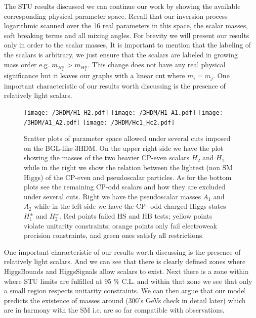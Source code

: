 The STU results discussed we can continue our work by showing the available corresponding physical parameter space. 
%
Recall that our inversion process logarithmic scanned over the 16 real parameters in this space, the scalar masses, soft breaking terms and all mixing angles.  
%
For brevity we will present our results only in order to the scalar masses,
%
%
It is important to mention that the labeling of the scalars is arbitrary, we just ensure that the scalars are labeled in growing mass order e.g. $m_{H^\pm_2} > m_{H^\pm_1}$. 
%
This change does not have any real physical significance but it leaves our graphs with a linear cut where $m_i = m_j$. 
%
One important characteristic of our results worth discussing is the presence of relatively light  scalars.
%
\begin{figure}[H]
	\centering
	\texttt{[image: /3HDM/H1\_H2.pdf]}
	\texttt{[image: /3HDM/H1\_A1.pdf]}
	\texttt{[image: /3HDM/A1\_A2.pdf]}
	\texttt{[image: /3HDM/Hc1\_Hc2.pdf]}
	\caption{Scatter plots of parameter space allowed under several cuts imposed on the BGL-like 3HDM. On the upper right side we have the plot showing the masses of the two heavier CP-even scalars $H_2$ and $H_1$ while in the right we show the relation between the lightest (non SM Higgs) of the CP-even and pseudoscalar particles. As for the bottom plots see the remaining CP-odd scalars and how they are excluded under several cuts. Right we have the pseudoscalar masses $A_1$ and $A_2$ while in the left side we have the CP- odd charged Higgs states $H_1^\pm$ and $H_2^\pm$.	Red points failed HS and HB tests; yellow points violate unitarity constraints; orange points only fail electroweak precision constraints, and green ones satisfy all restrictions.}
	\label{fig:H1_A1_Plots}
\end{figure}	

One important characteristic of our results worth discussing is the presence of relatively light  scalars. 
%
And we can see that there is clearly defined zones where HiggsBounds and HiggsSignals allow scalars to exist. 
%
Next there is a zone within where STU limits are fulfilled at 95 \% C.L. and within that zone we see that only a small region respects unitarity constraints. 
%
We can then argue that our model predicts the existence of masses around (300's GeVs check in detail later) which are in harmony with the SM i.e. are so far compatible with observations. 


